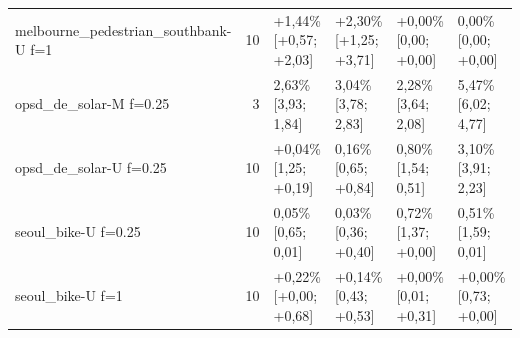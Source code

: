 \begin{table}[htbp]
\begin{tabular}{lrllll}
melbourne\_pedestrian\_southbank-U f=1 & 10 & +1,44\% [+0,57; +2,03] & +2,30\% [+1,25; +3,71] & +0,00\% [\textminus{}0,00; +0,00] & \textminus{}0,00\% [\textminus{}0,00; +0,00] \\
opsd\_de\_solar-M f=0.25 & 3 & \textminus{}2,63\% [\textminus{}3,93; \textminus{}1,84] & \textminus{}3,04\% [\textminus{}3,78; \textminus{}2,83] & \textminus{}2,28\% [\textminus{}3,64; \textminus{}2,08] & \textminus{}5,47\% [\textminus{}6,02; \textminus{}4,77] \\
opsd\_de\_solar-U f=0.25 & 10 & +0,04\% [\textminus{}1,25; +0,19] & \textminus{}0,16\% [\textminus{}0,65; +0,84] & \textminus{}0,80\% [\textminus{}1,54; \textminus{}0,51] & \textminus{}3,10\% [\textminus{}3,91; \textminus{}2,23] \\
seoul\_bike-U f=0.25 & 10 & \textminus{}0,05\% [\textminus{}0,65; \textminus{}0,01] & \textminus{}0,03\% [\textminus{}0,36; +0,40] & \textminus{}0,72\% [\textminus{}1,37; +0,00] & \textminus{}0,51\% [\textminus{}1,59; \textminus{}0,01] \\
seoul\_bike-U f=1 & 10 & +0,22\% [+0,00; +0,68] & +0,14\% [\textminus{}0,43; +0,53] & +0,00\% [\textminus{}0,01; +0,31] & +0,00\% [\textminus{}0,73; +0,00] \\
\bottomrule
\end{tabular}
\par{}
\end{table}
